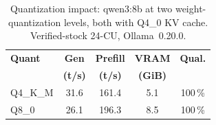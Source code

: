 \begin{table}[ht]
\caption{Quantization impact: qwen3:8b at two weight-quantization
levels, both with Q4\_0 KV cache.  Verified-stock 24-CU,
Ollama~0.20.0.}\label{tab:quant_impact}
\centering
\small
\begin{tabular}{@{}lcccc@{}}
\toprule
\textbf{Quant} & \textbf{Gen} & \textbf{Prefill} & \textbf{VRAM} & \textbf{Qual.} \\
               & \textbf{(t/s)} & \textbf{(t/s)} & \textbf{(GiB)} & \\
\otoprule
Q4\_K\_M  & 31.6 & 161.4 & 5.1 & 100\,\% \\
Q8\_0     & 26.1 & 196.3 & 8.5 & 100\,\% \\
\bottomrule
\end{tabular}
\end{table}
